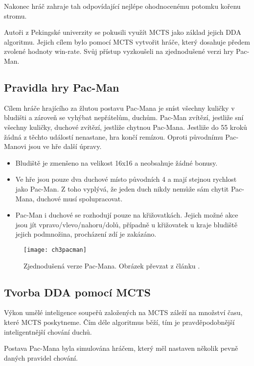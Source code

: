 Nakonec hráč zahraje tah odpovídající nejlépe ohodnocenému potomku kořenu stromu.

Autoři z Pekingské univerzity se pokusili využít MCTS jako základ jejich DDA algoritmu\cite{18Pac1}\cite{19Pac2}. 
Jejich cílem bylo pomocí MCTS vytvořit hráče, který dosahuje předem zvolené hodnoty win-rate. Svůj přístup vyzkoušeli na zjednodušené verzi hry Pac-Man.

\subsection{Pravidla hry Pac-Man}

Cílem hráče hrajícího za žlutou postavu Pac-Mana je sníst všechny kuličky v bludišti a zároveň se vyhýbat nepřátelům, duchům. Pac-Man zvítězí, jestliže sní všechny kuličky, duchové zvítězí, jestliže chytnou Pac-Mana. Jestliže do 55 kroků žádná z těchto událostí nenastane, hra končí remízou. Oproti původnímu Pac-Manovi jsou ve hře další úpravy.

\begin{itemize}
	\item Bludiště je zmenšeno na velikost 16x16 a neobsahuje žádné bonusy.
	\item Ve hře jsou pouze dva duchové místo původních 4 a mají stejnou rychlost jako Pac-Man. Z toho vyplývá, že jeden duch nikdy nemůže sám chytit Pac-Mana, duchové musí spolupracovat.
	\item Pac-Man i duchové se rozhodují pouze na křižovatkách. Jejich možné akce jsou jít vpravo/vlevo/nahoru/dolů, případně u křižovatek u kraje bludiště jejich podmnožina, procházení zdí je zakázáno.
\end{itemize}

\begin{figure}
  \centering
  \texttt{[image: ch3pacman]}
	\caption{Zjednodušená verze Pac-Mana. Obrázek převzat z článku \cite{18Pac1}.}
	\label{fig:ch3pacman}
\end{figure}

\subsection{Tvorba DDA pomocí MCTS}

Výkon umělé inteligence soupeřů založených na MCTS záleží na množství času, které MCTS poskytneme. Čím déle algoritmus běží, tím je pravděpodobnější inteligentnější chování duchů.

Postava Pac-Mana byla simulována hráčem, který měl nastaven několik pevně daných pravidel chování.

